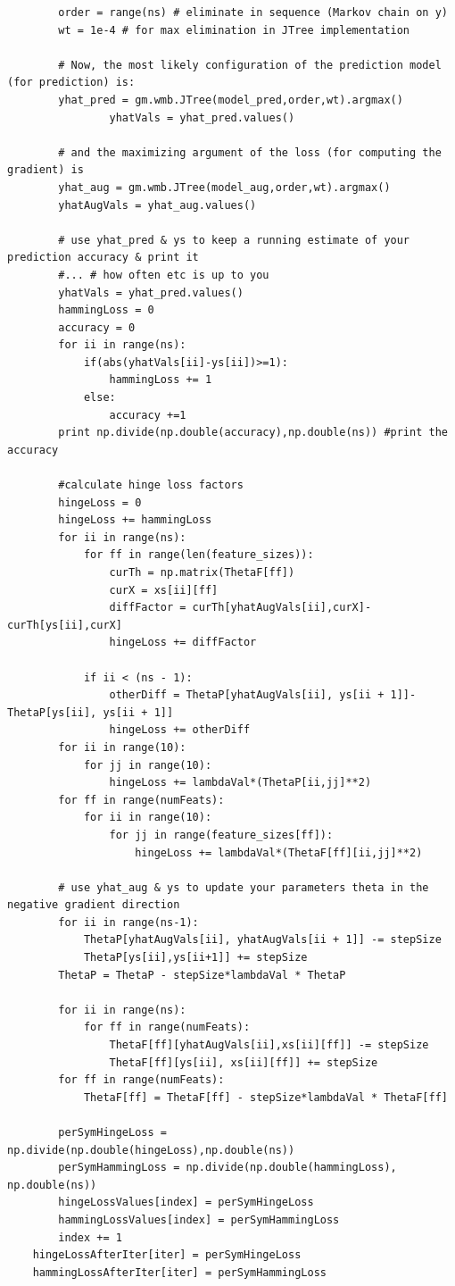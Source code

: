 \documentclass[twoside,11pt]{article}
\theoremstyle{definition}
\begin{document}
\begin{lstlisting}
        order = range(ns) # eliminate in sequence (Markov chain on y)
        wt = 1e-4 # for max elimination in JTree implementation

        # Now, the most likely configuration of the prediction model (for prediction) is:
        yhat_pred = gm.wmb.JTree(model_pred,order,wt).argmax()
				yhatVals = yhat_pred.values()
				
        # and the maximizing argument of the loss (for computing the gradient) is
        yhat_aug = gm.wmb.JTree(model_aug,order,wt).argmax()
        yhatAugVals = yhat_aug.values()

        # use yhat_pred & ys to keep a running estimate of your prediction accuracy & print it
        #... # how often etc is up to you
        yhatVals = yhat_pred.values()
        hammingLoss = 0
        accuracy = 0
        for ii in range(ns):
            if(abs(yhatVals[ii]-ys[ii])>=1):
                hammingLoss += 1
            else:
                accuracy +=1
        print np.divide(np.double(accuracy),np.double(ns)) #print the accuracy

        #calculate hinge loss factors
        hingeLoss = 0
        hingeLoss += hammingLoss
        for ii in range(ns):
            for ff in range(len(feature_sizes)):
                curTh = np.matrix(ThetaF[ff])
                curX = xs[ii][ff]
                diffFactor = curTh[yhatAugVals[ii],curX]-curTh[ys[ii],curX]
                hingeLoss += diffFactor

            if ii < (ns - 1):
                otherDiff = ThetaP[yhatAugVals[ii], ys[ii + 1]]-ThetaP[ys[ii], ys[ii + 1]]
                hingeLoss += otherDiff
        for ii in range(10):
            for jj in range(10):
                hingeLoss += lambdaVal*(ThetaP[ii,jj]**2)
        for ff in range(numFeats):
            for ii in range(10):
                for jj in range(feature_sizes[ff]):
                    hingeLoss += lambdaVal*(ThetaF[ff][ii,jj]**2)
										
        # use yhat_aug & ys to update your parameters theta in the negative gradient direction
        for ii in range(ns-1):
            ThetaP[yhatAugVals[ii], yhatAugVals[ii + 1]] -= stepSize
            ThetaP[ys[ii],ys[ii+1]] += stepSize
        ThetaP = ThetaP - stepSize*lambdaVal * ThetaP

        for ii in range(ns):
            for ff in range(numFeats):
                ThetaF[ff][yhatAugVals[ii],xs[ii][ff]] -= stepSize
                ThetaF[ff][ys[ii], xs[ii][ff]] += stepSize
        for ff in range(numFeats):
            ThetaF[ff] = ThetaF[ff] - stepSize*lambdaVal * ThetaF[ff]

        perSymHingeLoss = np.divide(np.double(hingeLoss),np.double(ns))
        perSymHammingLoss = np.divide(np.double(hammingLoss), np.double(ns))
        hingeLossValues[index] = perSymHingeLoss
        hammingLossValues[index] = perSymHammingLoss
        index += 1
    hingeLossAfterIter[iter] = perSymHingeLoss
    hammingLossAfterIter[iter] = perSymHammingLoss

\end{lstlisting}
\end{document}
